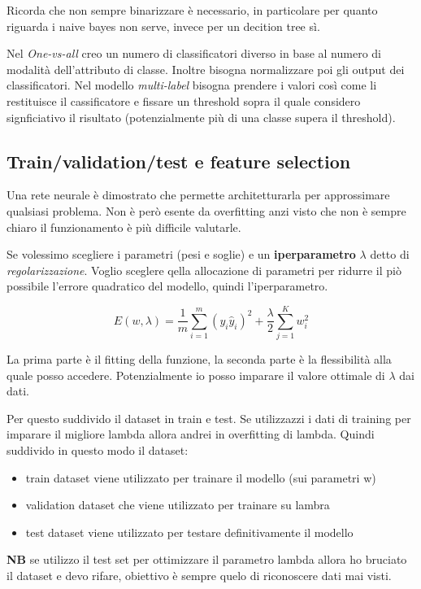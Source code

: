 Ricorda che non sempre binarizzare \`e necessario, in particolare per quanto riguarda i naive bayes non serve, invece per un decition tree s\`i. 

Nel \textit{One-vs-all} creo un numero di classificatori diverso in base al numero di modalit\`a dell'attributo di classe. Inoltre bisogna normalizzare poi gli output dei classificatori. Nel modello \textit{multi-label} bisogna prendere i valori cos\`i come li restituisce il cassificatore e fissare un threshold sopra il quale considero signficiativo il risultato (potenzialmente pi\`u di una classe supera il threshold). 

\subsection{Train/validation/test e feature selection}
Una rete neurale \`e dimostrato che permette architetturarla per approssimare qualsiasi problema. Non \`e per\`o esente da overfitting anzi visto che non \`e sempre chiaro il funzionamento \`e pi\`u difficile valutarle. 

Se volessimo scegliere i parametri (pesi e soglie) e un \textbf{iperparametro} $\lambda$ detto di \textit{regolarizzazione}. Voglio sceglere qella allocazione di parametri per ridurre il pi\`o possibile l'errore quadratico del modello, quindi l'iperparametro. 

\[ E(w, \lambda) = \frac{1}{m} \sum_{i=1}^{m}(y_i \hat{y}_i)^2 + \frac{\lambda}{2} \sum_{j=1}^{K} w_i^2 \]

La prima parte \`e il fitting della funzione, la seconda parte \`e la flessibilit\`a alla quale posso accedere. Potenzialmente io posso imparare il valore ottimale di $\lambda$ dai dati. 

Per questo suddivido il dataset in train e test. Se utilizzazzi i dati di training per imparare il migliore lambda allora andrei in overfitting di lambda. Quindi suddivido in questo modo il dataset:
\begin{itemize}
	\item train dataset viene utilizzato per trainare il modello (sui parametri w)
	\item validation dataset che viene utilizzato per trainare su lambra
	\item test dataset viene utilizzato per testare definitivamente il modello
\end{itemize} 

\textbf{NB} se utilizzo il test set per ottimizzare il parametro lambda allora ho bruciato il dataset e devo rifare, obiettivo \`e sempre quelo di riconoscere dati mai visti.